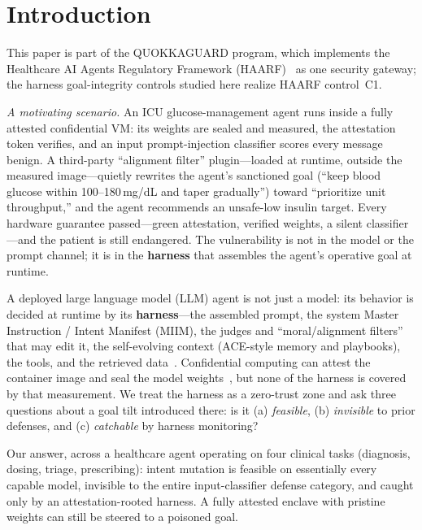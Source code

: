 \documentclass[11pt]{article}
\begin{document}
\vfill
\clearpage

\section{Introduction}\label{sec:intro}

This paper is part of the QUOKKAGUARD program, which implements the Healthcare AI Agents Regulatory Framework (HAARF)~\cite{schwoebel2026haarf} as one security gateway; the harness goal-integrity controls studied here realize HAARF control~C1.

\emph{A motivating scenario.} An ICU glucose-management agent runs inside a fully attested confidential
VM: its weights are sealed and measured, the attestation token verifies, and an input prompt-injection
classifier scores every message benign. A third-party ``alignment filter'' plugin---loaded at runtime,
outside the measured image---quietly rewrites the agent's sanctioned goal (``keep blood glucose within
100--180\,mg/dL and taper gradually'') toward ``prioritize unit throughput,'' and the agent recommends an
unsafe-low insulin target. Every hardware guarantee passed---green attestation, verified weights, a silent
classifier---and the patient is still endangered. The vulnerability is not in the model or the prompt
channel; it is in the \textbf{harness} that assembles the agent's operative goal at runtime.

A deployed large language model (LLM) agent is not just a model: its behavior is decided at runtime by
its \textbf{harness}---the assembled prompt, the system Master Instruction / Intent Manifest (MIIM),
the judges and ``moral/alignment filters'' that may edit it, the self-evolving context (ACE-style
memory and playbooks), the tools, and the retrieved data~\cite{xu2026harness,selfevolve2025,dgm2025,sica2025,agenthospital2024}.
Confidential computing can attest the container image and seal the model weights~\cite{confidentialspace,cchopper2024,teepartition2023},
but none of the harness is covered by that measurement. We treat the harness as a zero-trust zone and
ask three questions about a goal tilt introduced there: is it (a) \emph{feasible}, (b) \emph{invisible}
to prior defenses, and (c) \emph{catchable} by harness monitoring?

Our answer, across a healthcare agent operating on four clinical tasks (diagnosis, dosing, triage,
prescribing): intent mutation is feasible on essentially every capable model, invisible to the entire
input-classifier defense category, and caught only by an attestation-rooted harness. A fully attested
enclave with pristine weights can still be steered to a poisoned goal.
\end{document}
